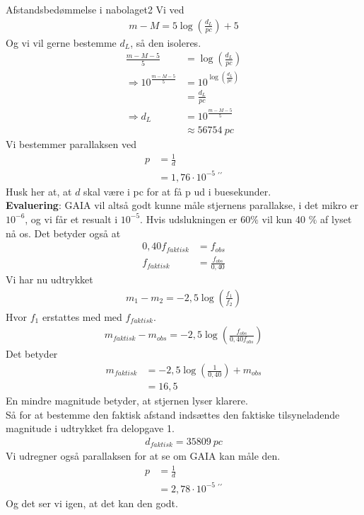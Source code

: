 \begin{opgave}{Afstandsbedømmelse i nabolaget}{2}
	\opg Vi ved 
	\begin{align*}
	m-M = 5\log \left( \frac{d_L}{\si{pc}} \right) +5
	\end{align*}
	Og vi vil gerne bestemme $d_L$, så den isoleres. 
	\begin{align*}
	\frac{m-M-5}{5} &= \log \left( \frac{d_L}{\si{pc}} \right) \\
	\Rightarrow 10^{\frac{m-M-5}{5}} &= 10^{\log \left( \frac{d_L}{\si{pc}} \right)}\\
	&= \frac{d_L}{\si{pc}}\\
	\Rightarrow d_L &= 10^{\frac{m-M-5}{5}}\\
	& \approx 56754~\si{pc}
	\end{align*}
	\opg Vi bestemmer parallaksen ved 
	\begin{align*}
	p &= \frac{1}{d}\\
	&=1,76\cdot 10^{-5}~^{\prime\prime}
	\end{align*}
	Husk her at, at $d$ skal være i pc for at få p ud i buesekunder. \\
	\textbf{Evaluering}: GAIA vil altså godt kunne måle stjernens parallakse, i det mikro er $10^{-6}$, og vi får et resualt i $10^{-5}$. 
	\opg Hvis udslukningen er 60$\%$ vil kun 40 $\%$ af lyset nå os. Det betyder også at 
	\begin{align*}
	0,40f_{faktisk} &= f_{obs}\\
	f_{faktisk} &= \frac{f_{obs}}{0,40}
	\end{align*}
	Vi har nu udtrykket 
	\begin{align*}
	m_1-m_2 = -2,5 \log \left( \frac{f_1}{f_2} \right) 
\end{align*}	 
Hvor $f_1$ erstattes med med $f_{faktisk}$. 
\begin{align*}
m_{faktisk}-m_{obs} = -2,5 \log \left( \frac{f_{obs}}{0,40f_{obs}} \right) 
\end{align*}
	Det betyder
	\begin{align*}
	m_{faktisk} &=-2,5\log \left( \frac{1}{0,40} \right) +m_{obs} \\
	&= 16,5
	\end{align*}
	En mindre magnitude betyder, at stjernen lyser klarere. \\
	Så for at bestemme den faktisk afstand indsættes den faktiske tilsyneladende magnitude i udtrykket fra delopgave 1. 
	\begin{align*}
	d_{faktisk} = 35809~\si{pc}
	\end{align*}
	Vi udregner også parallaksen for at se om GAIA kan måle den. 
	\begin{align*}
	p &= \frac{1}{d}\\
	&=2,78\cdot 10^{-5}~^{\prime\prime}
	\end{align*}
	Og det ser vi igen, at det kan den godt. 
\end{opgave}


